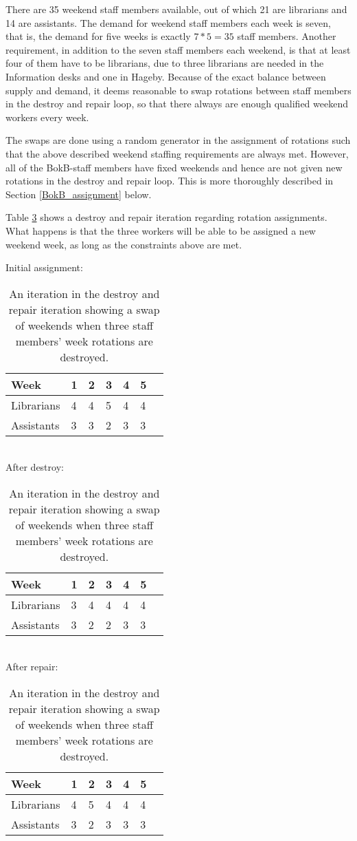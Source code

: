 There are 35 weekend staff members available, out of which 21 are librarians and 14 are assistants. The demand for weekend staff members each week is seven, that is, the demand for five weeks is exactly $7*5 = 35$ staff members. Another requirement, in addition to the seven staff members each weekend, is that at least four of them have to be librarians, due to three librarians are needed in the Information desks and one in Hageby. Because of the exact balance between supply and demand, it deems reasonable to swap rotations between staff members in the destroy and repair loop, so that there always are enough qualified weekend workers every week.

The swaps are done using a random generator in the assignment of rotations such that the above described weekend staffing requirements are always met. However, all of the BokB-staff members have fixed weekends and hence are not given new rotations in the destroy and repair loop. This is more thoroughly described in Section \ref{BokB_assignment} below. 

Table \ref{rotation_assignment} shows a destroy and repair iteration regarding rotation assignments. What happens is that the three workers will be able to be assigned a new weekend week, as long as the constraints above are met.

\begin{table}[!h]
\centering
\caption{An iteration in the destroy and repair iteration showing a swap of weekends when three staff members' week rotations are destroyed.}
\label{rotation_assignment}
Initial assignment:\\
\begin{tabular}{l|llllll}
\rowcolor[HTML]{C0C0C0}
Week       & 1 & 2 & 3 & 4 & 5  \\ \hline
Librarians & 4 & 4 & 5 & 4 & 4  \\ \hline
Assistants & 3 & 3 & 2 & 3 & 3 
\end{tabular}\\
After destroy:\\
\begin{tabular}{l|llllll}
\rowcolor[HTML]{C0C0C0}
Week       & 1                         & 2                         & 3                         & 4                         & 5                          \\ \hline
Librarians & \cellcolor[HTML]{FFFE65}3 & 4 & \cellcolor[HTML]{FFFE65}4 & 4 & 4  \\ \hline
Assistants & 3 & \cellcolor[HTML]{FFFE65}2 & 2 & 3 & 3
\end{tabular}\\
After repair:\\
\begin{tabular}{l|llllll}
\rowcolor[HTML]{C0C0C0}
Week       & 1 & 2 & 3 & 4 & 5  \\ \hline
Librarians & \cellcolor[HTML]{9AFF99}4 & \cellcolor[HTML]{9AFF99}5 & 4 & 4 & 4  \\ \hline
Assistants & 3 & 2 & \cellcolor[HTML]{9AFF99}3 & 3 & 3 
\end{tabular}
\end{table}

